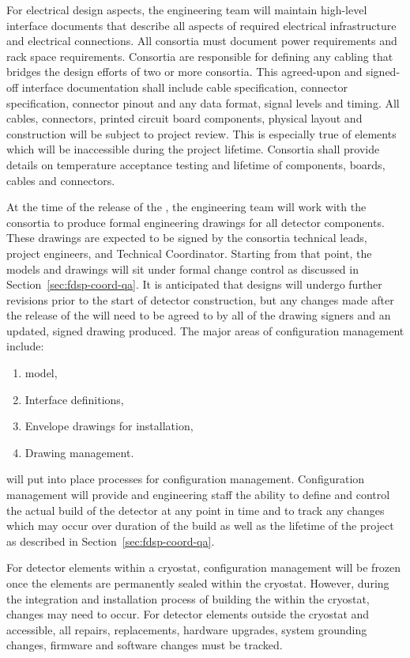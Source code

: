 For electrical design aspects, the  engineering team will maintain
high-level interface documents that describe all aspects of required
electrical infrastructure and electrical connections. All consortia
must document power requirements and rack space
requirements. Consortia are responsible for defining any cabling that
bridges the design efforts of two or more consortia. This agreed-upon
and signed-off interface documentation shall include cable
specification, connector specification, connector pinout and any data
format, signal levels and timing. All cables, connectors, printed
circuit board components, physical layout and construction will be
subject to project review. This is especially true of elements which
will be inaccessible during the project lifetime. Consortia shall
provide details on \lar temperature acceptance testing and
lifetime of components, boards, cables and connectors.


At the time of the release of the , the
 engineering team will work with the consortia to produce
formal engineering drawings for all detector components.  These
drawings are expected to be signed by the consortia technical leads,
project engineers, and Technical Coordinator.  Starting from that
point, the  models and drawings will sit under formal change
control as discussed in Section~\ref{sec:fdsp-coord-qa}.  It is
anticipated that designs will undergo further revisions prior to the
start of detector construction, but any changes made after the release
of the  will need to be agreed to by all of
the drawing signers and an updated, signed drawing produced. The major
areas of configuration management include:
\begin{enumerate}
  \item \threed model,
  \item Interface definitions,
  \item Envelope drawings for installation,
  \item Drawing management.
\end{enumerate}

 will put into place processes for configuration
management.  Configuration management will provide 
and engineering staff the ability to define and control
the actual build of the detector at any point in time and to track any
changes which may occur over duration of the build as well as the
lifetime of the project as described in
Section~\ref{sec:fdsp-coord-qa}.

For detector elements within a cryostat, configuration management
will be frozen once the elements are permanently sealed within the
cryostat.  However, during the integration and installation process of
building the  within the cryostat, changes may need to occur.
For detector elements outside the cryostat and accessible, all
repairs, replacements, hardware upgrades, system grounding changes,
firmware and software changes must be tracked.

